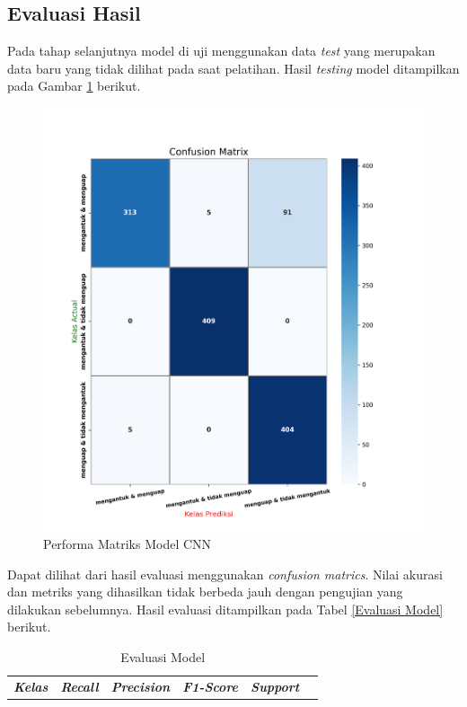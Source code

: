 \begin{table}[H]
  \subsection{Evaluasi Hasil}

        Pada tahap selanjutnya model di uji menggunakan data \textit{test} yang merupakan data baru yang tidak dilihat pada saat pelatihan. Hasil \textit{testing} model ditampilkan pada Gambar \ref{akurasi model terbaik} berikut.

          \begin{figure}[H]
              \centering
              \includegraphics[width=0.75\linewidth]{figures/bab4/confusion matriks.png}
              \caption{Performa Matriks Model CNN}
              \label{akurasi model terbaik}
          \end{figure}

        Dapat dilihat dari hasil evaluasi menggunakan \textit{confusion matrics}. Nilai akurasi dan metriks yang dihasilkan tidak berbeda jauh dengan pengujian yang dilakukan sebelumnya. Hasil evaluasi ditampilkan pada Tabel \ref{Evaluasi Model} berikut.


        \begin{table}[H]
        \centering
        \caption{Evaluasi Model}
        \begin{tabular}{lccccc}
            \toprule
            \textbf{\textit{Kelas}} & \textbf{\textit{Recall}} & \textbf{\textit{Precision}} &\textbf{\textit{F1-Score}} & \textbf{\textit{Support }}\\
            

\end{tabular}
\end{table}
\end{table}
